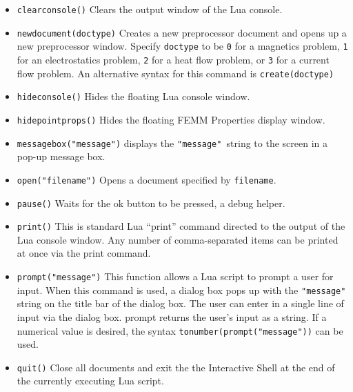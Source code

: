 \begin{itemize}

\item {\tt clearconsole()} Clears the output window of the Lua console.

\item {\tt newdocument(doctype)} Creates a new preprocessor document
and opens up a new preprocessor window.  Specify {\tt doctype} to
be {\tt 0} for a magnetics problem, {\tt 1} for an electrostatics
problem, {\tt 2} for a heat flow problem, or {\tt 3} for a current
flow problem. An alternative syntax for this command is {\tt create(doctype)} 

\item{\tt hideconsole()} Hides the floating Lua console window.

\item{\tt hidepointprops()} Hides the floating FEMM Properties
display window.

\item \texttt{messagebox("message")} displays the \texttt{"message" }string to the
screen in a pop-up message box.

\item {\tt open("filename")} Opens a document specified by
{\tt filename}.

\item \texttt{pause()} Waits for the ok button to be pressed, a debug helper.

\item \texttt{print()} This is standard Lua ``print'' command directed to the
output of the Lua console window. Any number of comma-separated items can be
printed at once via the print command.

\item \texttt{prompt("message")} This function allows a Lua script to prompt a
user for input. When this command is used, a dialog box pops up with the
\texttt{"message"} string on the title bar of the dialog box. The user can
enter in a single line of input via the dialog box. prompt returns the
user's input as a string. If a numerical value is desired, the syntax
\texttt{tonumber(prompt("message"))} can be used.

\item {\tt quit()} Close all documents and exit the the Interactive
Shell at the end of the currently executing Lua script.


\end{itemize}
